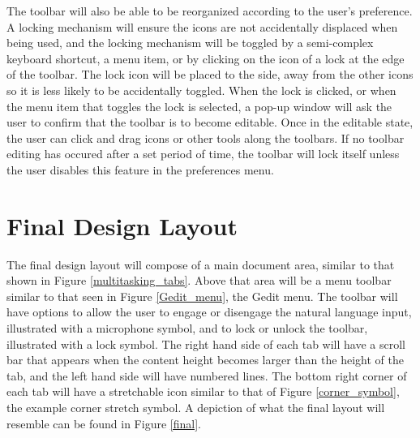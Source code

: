 \documentclass[11pt, oneside]{article}
\begin{document}
The toolbar will also be able to be reorganized according to the user's preference. A locking mechanism will ensure the icons are not accidentally displaced when being used, and the locking mechanism will be toggled by a semi-complex keyboard shortcut, a menu item, or by clicking on the icon of a lock at the edge of the toolbar. The lock icon will be placed to the side, away from the other icons so it is less likely to be accidentally toggled. When the lock is clicked, or when the menu item that toggles the lock is selected, a pop-up window will ask the user to confirm that the toolbar is to become editable. Once in the editable state, the user can click and drag icons or other tools along the toolbars. If no toolbar editing has occured after a set period of time, the toolbar will lock itself unless the user disables this feature in the preferences menu. 

\section{Final Design Layout}
The final design layout will compose of a main document area, similar to that shown in Figure \ref{multitasking_tabs}. Above that area will be a menu toolbar similar to that seen in Figure \ref{Gedit_menu}, the Gedit menu. The toolbar will have options to allow the user to engage or disengage the natural language input, illustrated with a microphone symbol, and to lock or unlock the toolbar, illustrated with a lock symbol. The right hand side of each tab will have a scroll bar that appears when the content height becomes larger than the height of the tab, and the left hand side will have numbered lines. The bottom right corner of each tab will have a stretchable icon similar to that of Figure \ref{corner_symbol}, the example corner stretch symbol. A depiction of what the final layout will resemble can be found in Figure \ref{final}.
\end{document}
